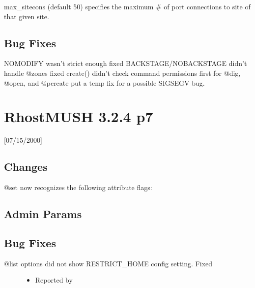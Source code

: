 \documentclass[letterpaper,10pt,english]{sphinxmanual}
\begin{document}
\sphinxAtStartPar
max\_sitecons \sphinxhyphen{} (default 50) specifies the maximum \# of port connections to site of that given site.


\subsection{Bug Fixes}
\label{\detokenize{changelog:id66}}
\sphinxAtStartPar
NOMODIFY wasn’t strict enough \sphinxhyphen{} fixed
BACKSTAGE/NOBACKSTAGE didn’t handle @zones \sphinxhyphen{} fixed
create() didn’t check command permissions first for @dig, @open, and @pcreate
put a temp fix for a possible SIGSEGV bug.


\section{RhostMUSH 3.2.4 p7}
\label{\detokenize{changelog:rhostmush-3-2-4-p7}}\label{\detokenize{changelog:changelog-3-2-4p7}}
\sphinxAtStartPar
{[}07/15/2000{]}


\subsection{Changes}
\label{\detokenize{changelog:id67}}
\sphinxAtStartPar
@set now recognizes the following attribute flags:

\begin{sphinxVerbatim}[commandchars=\\\{\}]
   
   
\end{sphinxVerbatim}


\subsection{Admin Params}
\label{\detokenize{changelog:id68}}

\subsection{Bug Fixes}
\label{\detokenize{changelog:id69}}\begin{description}
\item[{@list options did not show RESTRICT\_HOME config setting.  Fixed}] \leavevmode\begin{itemize}
\item {} 
\sphinxAtStartPar
Reported by 

\end{itemize}

\end{description}
\end{document}

